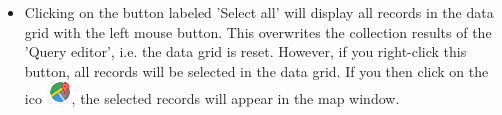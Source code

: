 \documentclass[a4paper,12pt]{article}
\begin{document}
\begin{itemize}
	\item Clicking on the button labeled 'Select all' will display all records in the data grid with the left mouse button. This overwrites the collection results of the 'Query editor', i.e. the data grid is reset. However, if you right-click this button, all records will be selected in the data grid. If you then click on the ico \includegraphics [width = 0.5 cm] {mapviewer_ikon.png}, the selected records will appear in the map window.
	


\end{itemize}
\end{document}
